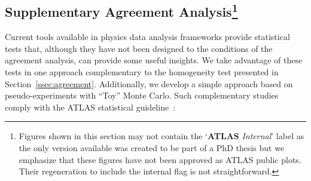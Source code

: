 %
%
%
%
\FloatBarrier
\subsection[Supplementary Agreement Analysis]{Supplementary Agreement
Analysis\footnote{Figures shown in this section may not contain the
`\textbf{ATLAS} \emph{Internal}' label as the only version available was
created to be part of a PhD thesis but we emphasize that these figures have
not been approved as ATLAS public plots. Their regeneration to include the
internal flag is not straightforward.}}\label{ssec:supplementary_agreement}


Current tools available in physics data analysis frameworks provide statistical
tests that, although they have not been designed to the conditions of the
agreement analysis, can provide some useful insights. We take advantage of these
tests in one approach complementary to the homogeneity test presented in
Section~\ref{ssec:agreement}. Additionally, we develop a simple approach based
on pseudo-experiments with ``Toy'' Monte Carlo. Such complementary studies
comply with the ATLAS statistical guideline~\cite{atlas_recommendations_stats}:

